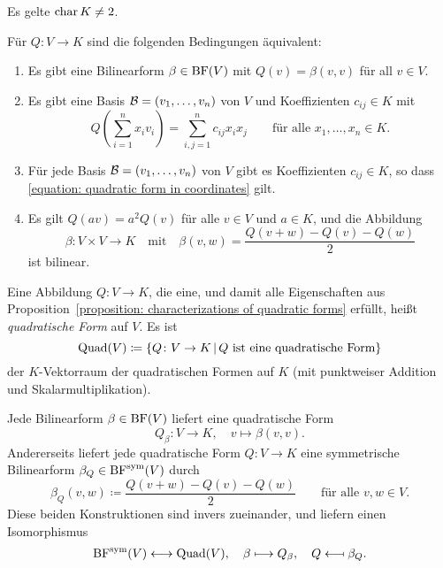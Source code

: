Es gelte $\operatorname{char} K \neq 2$.

\begin{proposition}
  \label{proposition: characterizations of quadratic forms}
  Für $Q \colon V \to K$ sind die folgenden Bedingungen äquivalent:
  \begin{enumerate}
    \item
      Es gibt eine Bilinearform $\beta \in \operatorname{BF}(V)$ mit $Q(v) = \beta(v, v)$ für all $v \in V$.
    \item
      Es gibt eine Basis $\mathcal{B} = (v_1, \dotsc, v_n)$ von $V$ und Koeffizienten $c_{ij} \in K$ mit
      \begin{equation}
        \label{equation: quadratic form in coordinates}
          Q\left( \sum_{i=1}^n x_i v_i \right)
        = \sum_{i,j=1}^n c_{ij} x_i x_j
        \qquad
        \text{für alle $x_1, \dotsc, x_n \in K$}.
      \end{equation}
    \item
      Für jede Basis $\mathcal{B} = (v_1, \dotsc, v_n)$ von $V$ gibt es Koeffizienten $c_{ij} \in K$, so dass \eqref{equation: quadratic form in coordinates} gilt.
    \item
      Es gilt $Q(av) = a^2 Q(v)$ für alle $v \in V$ und $a \in K$, und die Abbildung
      \[
                \beta
        \colon  V \times V
        \to     K
        \quad\text{mit}\quad
          \beta(v,w)
        = \frac{ Q(v + w) - Q(v) - Q(w) }{2}
      \]
      ist bilinear.
  \end{enumerate}
\end{proposition}

\begin{definition}
  Eine Abbildung $Q \colon V \to K$, die eine, und damit alle Eigenschaften aus Proposition~\ref{proposition: characterizations of quadratic forms} erfüllt, heißt \emph{quadratische Form} auf $V$.
  Es ist
  \[
              \operatorname{Quad}(V)
    \coloneqq \{ Q \colon V \to K \,|\, \text{$Q$ ist eine quadratische Form} \}
  \]
  der $K$-Vektorraum der quadratischen Formen auf $K$ \textup(mit punktweiser Addition und Skalarmultiplikation\textup).
\end{definition}

Jede Bilinearform $\beta \in \operatorname{BF}(V)$ liefert eine quadratische Form
\[
          Q_\beta
  \colon  V
  \to     K,
  \quad   v
  \mapsto \beta(v,v).
\]
Andererseits liefert jede quadratische Form $Q \colon V \to K$ eine symmetrische Bilinearform $\beta_Q \in \operatorname{BF}^{\operatorname{sym}}(V)$ durch
\begin{equation}
  \label{equation: polarisation formula}
            \beta_Q(v,w)
  \coloneqq \frac{Q(v+w) - Q(v) - Q(w)}{2}
  \qquad
  \text{für alle $v, w \in V$}.
\end{equation}
Diese beiden Konstruktionen sind invers zueinander, und liefern einen Isomorphismus
\begin{align*}
                      \operatorname{BF}^{\operatorname{sym}}(V)
  \longleftrightarrow \operatorname{Quad}(V),
  \quad
                      \beta
  \longmapsto         Q_\beta,
  \quad
                      Q
  \longmapsfrom       \beta_Q.
\end{align*}

